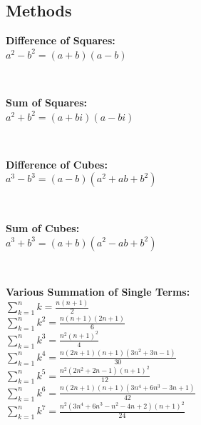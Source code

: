 \subsection*{Methods}
\begin{minipage}{\textwidth}
    \textbf{Difference of Squares:}
    \\ \( a^2 - b^2 = ( a + b ) ( a - b ) \)
\end{minipage}
\\ \begin{minipage}{\textwidth}
    \textbf{Sum of Squares:}
    \\ \( a^2 + b^2 = ( a + bi ) ( a - bi ) \)
\end{minipage}
\\ \begin{minipage}{\textwidth}
    \textbf{Difference of Cubes:}
    \\ \( a^3 - b^3 = ( a - b )( a^2 + ab + b^2 ) \)
\end{minipage}
\\ \begin{minipage}{\textwidth}
    \textbf{Sum of Cubes:}
    \\ \( a^3 + b^3 = ( a + b )( a^2 - ab + b^2 ) \)
\end{minipage}
\\ \begin{minipage}{\textwidth}
    \textbf{Various Summation of Single Terms:}
    \\ \( \displaystyle\sum_{k = 1}^n { k } = \displaystyle\frac{ n( n + 1 ) }{ 2 } \)
    \\ \( \displaystyle\sum_{k = 1}^n { k^2 } = \displaystyle\frac{ n( n + 1 )( 2n + 1 ) }{ 6 } \)
    \\ \( \displaystyle\sum_{k = 1}^n { k^3 } = \displaystyle\frac{ n^2( n + 1 )^2 }{ 4 } \)
    \\ \( \displaystyle\sum_{k = 1}^n { k^4 } = \displaystyle\frac{ n( 2n + 1 )( n + 1 )( 3n^2 + 3n - 1 ) }{ 30 } \)
    \\ \( \displaystyle\sum_{k = 1}^n { k^5 } = \displaystyle\frac{ n^2 ( 2n^2 + 2n - 1 )( n + 1 )^2 }{ 12 } \)
    \\ \( \displaystyle\sum_{k = 1}^n { k^6 } = \displaystyle\frac{ n( 2n + 1 )( n + 1 )( 3n^4 + 6n^3 - 3n + 1 ) }{ 42 } \)
    \\ \( \displaystyle\sum_{k = 1}^n { k^7 } = \displaystyle\frac{ n^2 ( 3n^4 + 6n^3 - n^2 - 4n + 2 )( n + 1 )^2 }{ 24 } \)
\end{minipage}